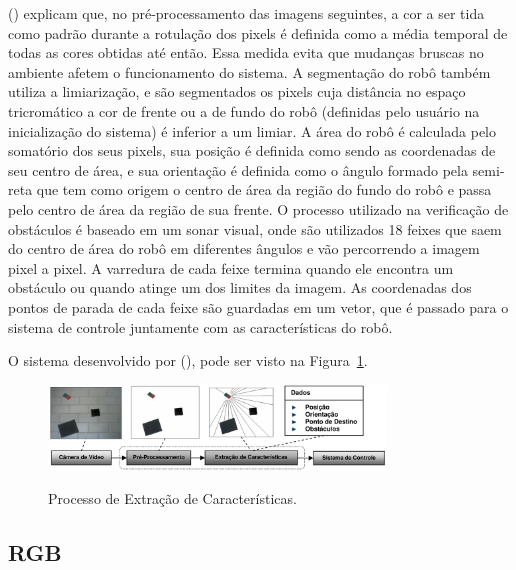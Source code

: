 \citeauthor{andrade2006sistema} (\citeyear{andrade2006sistema}) explicam que, no pré-processamento das imagens seguintes, a cor a ser tida como padrão durante a rotulação dos pixels é definida como a média temporal de todas as cores obtidas até então. Essa medida evita que mudanças bruscas no ambiente afetem o funcionamento do sistema. A segmentação do robô também utiliza a limiarização, e são segmentados os pixels cuja distância no espaço tricromático a cor de frente ou a de fundo do robô (definidas pelo usuário na inicialização do sistema) é inferior a um limiar. A área do robô é calculada pelo somatório dos seus pixels, sua posição é definida como sendo as coordenadas de seu centro de área, e sua orientação é definida como o ângulo formado pela semi-reta que tem como origem o centro de área da região do fundo do robô e passa pelo centro de área da região de sua frente. O processo utilizado na verificação de obstáculos é baseado em um sonar visual, onde são utilizados 18 feixes que saem do centro de área do robô em diferentes ângulos e vão percorrendo a imagem pixel a pixel. A varredura de cada feixe termina quando ele encontra um obstáculo ou quando atinge um dos limites da imagem. As coordenadas dos pontos de parada de cada feixe são guardadas em um vetor, que é passado para o sistema de controle juntamente com as características do robô.

O sistema desenvolvido por \citeauthor{andrade2006sistema} (\citeyear{andrade2006sistema}), pode ser visto na Figura~\ref{fig:triangulacao}.

\begin{figure}[!hbtp]
  \centering
   \caption{Processo de Extração de Características.}
    \includegraphics[width = 0.8\textwidth]{Caps/Figs/ref-teorico/triangulacao.png}
   \label{fig:triangulacao}
\end{figure}


\subsection{RGB}
\label{subsec:rgb}

